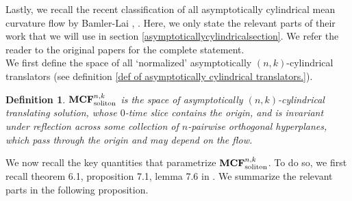 \documentclass[pdflatex,sn-mathphys-num]{sn-jnl}%
\newtheorem{definition}{Definition}[section]
\begin{document}
Lastly, we recall the recent classification of all asymptotically cylindrical mean curvature flow by Bamler-Lai \cite{Bamler2025-pdeodi}, \cite{Bamler2025-thclassification}. Here, we only state the relevant parts of their work that we will use in section \ref{asymptoticallycylindricalsection}. We refer the reader to the original papers for the complete statement.\\

We first define the space of all `normalized' asymptotically $(n,k)$-cylindrical translators (see definition \ref{def of asymptotically cylindrical translators.}). 
\begin{definition}\label{Definition of MCFsoliton}
$\textup{\textbf{MCF}}^{n,k}_{\textup{soliton}}$ is the space of asymptotically $(n,k)$-cylindrical translating solution, whose $0$-time slice contains the origin, and is invariant under reflection across some collection of $n$-pairwise orthogonal hyperplanes, which pass through the origin and may depend on the flow.
\end{definition}
We now recall the key quantities that parametrize $\textup{\textbf{MCF}}^{n,k}_{\textup{soliton}}$. To do so, we first recall theorem 6.1, proposition 7.1, lemma 7.6 in \cite{Bamler2025-pdeodi}. We summarize the relevant parts in the following proposition. 
\end{document}
